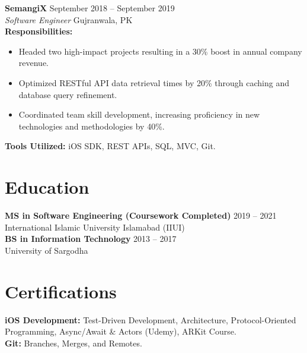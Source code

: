 \documentclass[letter,10pt]{article}
\newcommand{\role}[4]{
    \noindent\textbf{#1} \hfill #3 \\
    \textit{#2} \hfill #4 \\
}
\begin{document}
\role{SemangiX}{Software Engineer}{September 2018 -- September 2019}{Gujranwala, PK}
\noindent\textbf{Responsibilities:}
\begin{itemize}[noitemsep, topsep=2pt]
    \item Headed two high-impact projects resulting in a 30\% boost in annual company revenue.
    \item Optimized RESTful API data retrieval times by 20\% through caching and database query refinement.
    \item Coordinated team skill development, increasing proficiency in new technologies and methodologies by 40\%.
\end{itemize}
\noindent\textbf{Tools Utilized:} iOS SDK, REST APIs, SQL, MVC, Git.

\section*{Education}
\noindent\textbf{MS in Software Engineering (Coursework Completed)} \hfill 2019 -- 2021 \\
International Islamic University Islamabad (IIUI) \\

\noindent\textbf{BS in Information Technology} \hfill 2013 -- 2017 \\
University of Sargodha

\section*{Certifications}
\noindent\textbf{iOS Development:} Test-Driven Development, Architecture, Protocol-Oriented Programming, Async/Await \& Actors (Udemy), ARKit Course. \\
\textbf{Git:} Branches, Merges, and Remotes.
\end{document}
